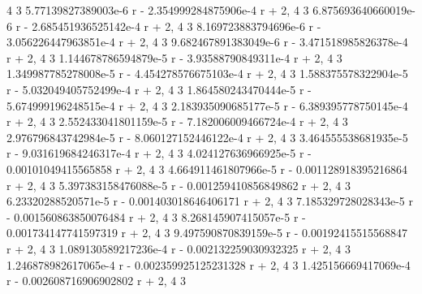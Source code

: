 \documentclass[12pt,arial,letterpaper]{book}
\begin{document}
\begin{eulercomment}
\begin{eulercomment}
\begin{eulercomment}
\begin{eulercomment}
\begin{eulercomment}
\begin{eulercomment}
\begin{eulercomment}
\begin{eulercomment}
\begin{eulercomment}
\begin{eulercomment}
\begin{eulercomment}
\begin{eulercomment}
\begin{eulercomment}
\begin{eulercomment}
\begin{eulercomment}
\begin{eulercomment}
\begin{eulercomment}
\begin{eulercomment}
\begin{eulercomment}
\begin{eulercomment}
\begin{eulercomment}
\begin{eulercomment}
\begin{euleroutput}
                       4                         3
  5.77139827389003e-6 r  - 2.354999284875906e-4 r  + 2, 
                        4                         3
  6.875693640660019e-6 r  - 2.685451936525142e-4 r  + 2, 
                        4                         3
  8.169723883794696e-6 r  - 3.056226447963851e-4 r  + 2, 
                        4                         3
  9.682467891383049e-6 r  - 3.471518985826378e-4 r  + 2, 
                        4                        3
  1.144678786594879e-5 r  - 3.93588790849311e-4 r  + 2, 
                        4                         3
  1.349987785278008e-5 r  - 4.454278576675103e-4 r  + 2, 
                        4                         3
  1.588375578322904e-5 r  - 5.032049405752499e-4 r  + 2, 
                        4                         3
  1.864580243470444e-5 r  - 5.674999196248515e-4 r  + 2, 
                        4                         3
  2.183935090685177e-5 r  - 6.389395778750145e-4 r  + 2, 
                        4                         3
  2.552433041801159e-5 r  - 7.182006009466724e-4 r  + 2, 
                        4                         3
  2.976796843742984e-5 r  - 8.060127152446122e-4 r  + 2, 
                        4                         3
  3.464555538681935e-5 r  - 9.031619684246317e-4 r  + 2, 
                        4                        3
  4.024127636966925e-5 r  - 0.00101049415565858 r  + 2, 
                        4                         3
  4.664911461807966e-5 r  - 0.001128918395216864 r  + 2, 
                        4                         3
  5.397383158476088e-5 r  - 0.001259410856849862 r  + 2, 
                       4                         3
  6.23320288520571e-5 r  - 0.001403018646406171 r  + 2, 
                        4                         3
  7.185329728028343e-5 r  - 0.001560863850076484 r  + 2, 
                        4                         3
  8.268145907415057e-5 r  - 0.001734147741597319 r  + 2, 
                        4                        3
  9.497590870839159e-5 r  - 0.00192415515568847 r  + 2, 
                        4                         3
  1.089130589217236e-4 r  - 0.002132259030932325 r  + 2, 
                        4                         3
  1.246878982617065e-4 r  - 0.002359925125231328 r  + 2, 
                        4                         3
  1.425156669417069e-4 r  - 0.002608716906902802 r  + 2, 
                        4                         3

\end{euleroutput}
\end{eulercomment}
\end{eulercomment}
\end{eulercomment}
\end{eulercomment}
\end{eulercomment}
\end{eulercomment}
\end{eulercomment}
\end{eulercomment}
\end{eulercomment}
\end{eulercomment}
\end{eulercomment}
\end{eulercomment}
\end{eulercomment}
\end{eulercomment}
\end{eulercomment}
\end{eulercomment}
\end{eulercomment}
\end{eulercomment}
\end{eulercomment}
\end{eulercomment}
\end{eulercomment}
\end{eulercomment}
\end{document}
